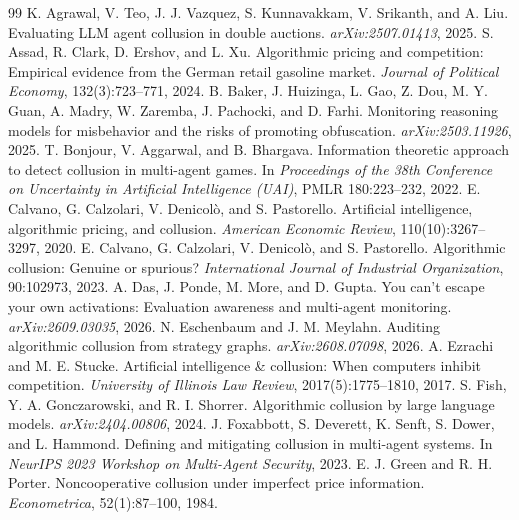 \documentclass[10pt]{article}
\begin{document}
\small
\begin{thebibliography}{99}\setlength{\itemsep}{1pt}
 K. Agrawal, V. Teo, J. J. Vazquez, S. Kunnavakkam, V. Srikanth, and A. Liu. Evaluating LLM agent collusion in double auctions. \emph{arXiv:2507.01413}, 2025.
 S. Assad, R. Clark, D. Ershov, and L. Xu. Algorithmic pricing and competition: Empirical evidence from the German retail gasoline market. \emph{Journal of Political Economy}, 132(3):723--771, 2024.
 B. Baker, J. Huizinga, L. Gao, Z. Dou, M. Y. Guan, A. Madry, W. Zaremba, J. Pachocki, and D. Farhi. Monitoring reasoning models for misbehavior and the risks of promoting obfuscation. \emph{arXiv:2503.11926}, 2025.
 T. Bonjour, V. Aggarwal, and B. Bhargava. Information theoretic approach to detect collusion in multi-agent games. In \emph{Proceedings of the 38th Conference on Uncertainty in Artificial Intelligence (UAI)}, PMLR 180:223--232, 2022.
 E. Calvano, G. Calzolari, V. Denicol\`o, and S. Pastorello. Artificial intelligence, algorithmic pricing, and collusion. \emph{American Economic Review}, 110(10):3267--3297, 2020.
 E. Calvano, G. Calzolari, V. Denicol\`o, and S. Pastorello. Algorithmic collusion: Genuine or spurious? \emph{International Journal of Industrial Organization}, 90:102973, 2023.
 A. Das, J. Ponde, M. More, and D. Gupta. You can't escape your own activations: Evaluation awareness and multi-agent monitoring. \emph{arXiv:2609.03035}, 2026.
 N. Eschenbaum and J. M. Meylahn. Auditing algorithmic collusion from strategy graphs. \emph{arXiv:2608.07098}, 2026.
 A. Ezrachi and M. E. Stucke. Artificial intelligence \& collusion: When computers inhibit competition. \emph{University of Illinois Law Review}, 2017(5):1775--1810, 2017.
 S. Fish, Y. A. Gonczarowski, and R. I. Shorrer. Algorithmic collusion by large language models. \emph{arXiv:2404.00806}, 2024.
 J. Foxabbott, S. Deverett, K. Senft, S. Dower, and L. Hammond. Defining and mitigating collusion in multi-agent systems. In \emph{NeurIPS 2023 Workshop on Multi-Agent Security}, 2023.
 E. J. Green and R. H. Porter. Noncooperative collusion under imperfect price information. \emph{Econometrica}, 52(1):87--100, 1984.

\end{thebibliography}
\end{document}
